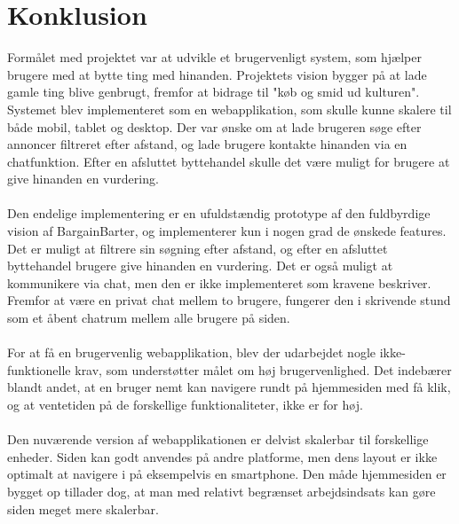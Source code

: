 \chapter{Konklusion}
Formålet med projektet var at udvikle et brugervenligt system, som hjælper brugere med at bytte ting med hinanden. Projektets vision bygger på at lade gamle ting blive genbrugt, fremfor at bidrage til "køb og smid ud kulturen". Systemet blev implementeret som en webapplikation, som skulle kunne skalere til både mobil, tablet og desktop. Der var ønske om at lade brugeren søge efter annoncer filtreret efter afstand, og lade brugere kontakte hinanden via en chatfunktion. Efter en afsluttet byttehandel skulle det være muligt for brugere at give hinanden en vurdering. \\ \\ \noindent
Den endelige implementering er en ufuldstændig prototype af den fuldbyrdige vision af BargainBarter, og implementerer kun i nogen grad de ønskede features. Det er muligt at filtrere sin søgning efter afstand, og efter en afsluttet byttehandel brugere give hinanden en vurdering. Det er også muligt at kommunikere via chat, men den er ikke implementeret som kravene beskriver. Fremfor at være en privat chat mellem to brugere, fungerer den i skrivende stund som et åbent chatrum mellem alle brugere på siden. 
\\ \\ \noindent
For at få en brugervenlig webapplikation, blev der udarbejdet nogle ikke-funktionelle krav, som understøtter målet om høj brugervenlighed. Det indebærer blandt andet, at en bruger nemt kan navigere rundt på hjemmesiden med få klik, og at ventetiden på de forskellige funktionaliteter, ikke er for høj. \\ \\ \noindent
Den nuværende version af webapplikationen er delvist skalerbar til forskellige enheder. Siden kan godt anvendes på andre platforme, men dens layout er ikke optimalt at navigere i på eksempelvis en smartphone. Den måde hjemmesiden er bygget op tillader dog, at man med relativt begrænset arbejdsindsats kan gøre siden meget mere skalerbar. 




